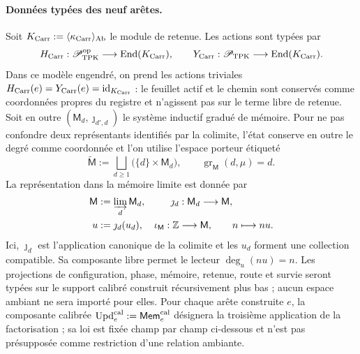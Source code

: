 \paragraph{Données typées des neuf arêtes.}
Soit
\(K_{\rm Carr}:=\langle\kappa_{\rm Carr}\rangle_{\rm Ab}\) le module de
retenue. Les actions sont typées par
\[
 H_{\rm Carr}:\mathscr P_{\rm TPK}^{\rm op}
   \longrightarrow\operatorname{End}(K_{\rm Carr}),\qquad
 Y_{\rm Carr}:\mathscr P_{\rm TPK}
   \longrightarrow\operatorname{End}(K_{\rm Carr}).
\]
Dans ce modèle engendré, on prend les actions triviales \(H_{\rm Carr}(e)=Y_{\rm Carr}(e)=\operatorname{id}_{K_{\rm Carr}}\) : le feuillet actif et le chemin sont conservés comme coordonnées propres du registre et n'agissent pas sur le terme libre de retenue. Soit en outre \((\mathsf M_d,\jmath_{d',d})\) le système inductif gradué de mémoire. Pour ne pas confondre deux représentants identifiés par la colimite, l'état conserve en outre le degré comme coordonnée et l'on utilise l'espace porteur étiqueté
\[
 \widetilde{\mathsf M}:=
 \bigsqcup_{d\ge1}\bigl(\{d\}\times\mathsf M_d\bigr),
 \qquad
 \operatorname{gr}_{\mathsf M}(d,\mu)=d.
\]
La représentation dans la mémoire limite est donnée par
\[
\begin{aligned}
 \mathsf M&:=\varinjlim_d\mathsf M_d,&
 \jmath_d&:\mathsf M_d\longrightarrow\mathsf M,\\
 u&:=\jmath_d(u_d),&
 \iota_{\mathsf M}:\mathbb Z&\longrightarrow\mathsf M,
 \qquad n\longmapsto nu .
\end{aligned}
\]
Ici, \(\jmath_d\) est l'application canonique de la colimite et les \(u_d\) forment une collection compatible. Sa composante libre permet le lecteur \(\deg_u(nu)=n\). Les projections de configuration, phase, mémoire, retenue, route et survie seront typées sur le support calibré construit récursivement plus bas ; aucun espace ambiant ne sera importé pour elles. Pour chaque arête construite \(e\), la composante calibrée \(\operatorname{Upd}^{\rm cal}_e:=\mathsf{Mem}^{\rm cal}_e\) désignera la troisième application de la factorisation ; sa loi est fixée champ par champ ci-dessous et n'est pas présupposée comme restriction d'une relation ambiante.

